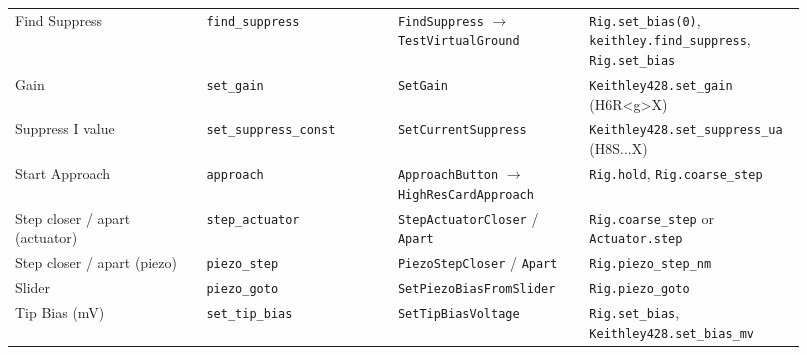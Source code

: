 \begin{longtable}{@{}>{\raggedright\arraybackslash}p{0.230\linewidth}>{\raggedright\arraybackslash}p{0.230\linewidth}>{\raggedright\arraybackslash}p{0.230\linewidth}>{\raggedright\arraybackslash}p{0.230\linewidth}@{}}
Find Suppress & \texttt{find\_\discretionary{}{}{}suppress} & \texttt{Find\discretionary{}{}{}Suppress} $\rightarrow$ \texttt{Test\discretionary{}{}{}Virtual\discretionary{}{}{}Ground} & \texttt{Rig.\discretionary{}{}{}set\_\discretionary{}{}{}bias(0)}, \texttt{keithley.\discretionary{}{}{}find\_\discretionary{}{}{}suppress}, \texttt{Rig.\discretionary{}{}{}set\_\discretionary{}{}{}bias} \\
Gain & \texttt{set\_\discretionary{}{}{}gain} & \texttt{Set\discretionary{}{}{}Gain} & \texttt{Keithley428.\discretionary{}{}{}set\_\discretionary{}{}{}gain} (H6R<g>X) \\
Suppress I value & \texttt{set\_\discretionary{}{}{}suppress\_\discretionary{}{}{}const} & \texttt{Set\discretionary{}{}{}Current\discretionary{}{}{}Suppress} & \texttt{Keithley428.\discretionary{}{}{}set\_\discretionary{}{}{}suppress\_\discretionary{}{}{}ua} (H8S...X) \\
Start Approach & \texttt{approach} & \texttt{Approach\discretionary{}{}{}Button} $\rightarrow$ \texttt{High\discretionary{}{}{}Res\discretionary{}{}{}Card\discretionary{}{}{}Approach} & \texttt{Rig.\discretionary{}{}{}hold}, \texttt{Rig.\discretionary{}{}{}coarse\_\discretionary{}{}{}step} \\
Step closer / apart (actuator) & \texttt{step\_\discretionary{}{}{}actuator} & \texttt{Step\discretionary{}{}{}Actuator\discretionary{}{}{}Closer} / \texttt{Apart} & \texttt{Rig.\discretionary{}{}{}coarse\_\discretionary{}{}{}step} or \texttt{Actuator.\discretionary{}{}{}step} \\
Step closer / apart (piezo) & \texttt{piezo\_\discretionary{}{}{}step} & \texttt{Piezo\discretionary{}{}{}Step\discretionary{}{}{}Closer} / \texttt{Apart} & \texttt{Rig.\discretionary{}{}{}piezo\_\discretionary{}{}{}step\_\discretionary{}{}{}nm} \\
Slider & \texttt{piezo\_\discretionary{}{}{}goto} & \texttt{Set\discretionary{}{}{}Piezo\discretionary{}{}{}Bias\discretionary{}{}{}From\discretionary{}{}{}Slider} & \texttt{Rig.\discretionary{}{}{}piezo\_\discretionary{}{}{}goto} \\
Tip Bias (mV) & \texttt{set\_\discretionary{}{}{}tip\_\discretionary{}{}{}bias} & \texttt{Set\discretionary{}{}{}Tip\discretionary{}{}{}Bias\discretionary{}{}{}Voltage} & \texttt{Rig.\discretionary{}{}{}set\_\discretionary{}{}{}bias}, \texttt{Keithley428.\discretionary{}{}{}set\_\discretionary{}{}{}bias\_\discretionary{}{}{}mv} \\

\end{longtable}
